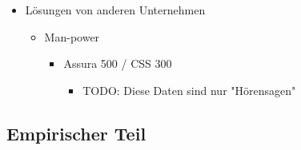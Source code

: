 \documentclass[12pt, twoside]{extarticle}
\begin{document}
\begin{itemize}
    \item Lösungen von anderen Unternehmen
    \begin{itemize}
		\item Man-power
        \begin{itemize}
		    \item Assura 500 / CSS 300
            \begin{itemize}
			    \item TODO: Diese Daten sind nur "Hörensagen"
            \end{itemize}
        \end{itemize}
    \end{itemize}
\end{itemize}


\subsection{Empirischer Teil}
\end{document}
